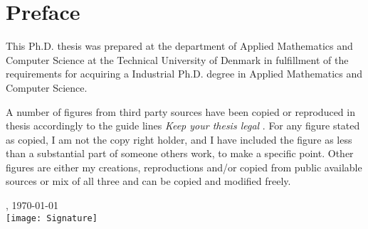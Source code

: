 \chapter{Preface}
This Ph.D. thesis was prepared at the department of Applied Mathematics and Computer Science at the Technical University of Denmark in fulfillment of the requirements for acquiring a Industrial Ph.D. degree in Applied Mathematics and Computer Science.

A number of figures from third party sources have been copied or reproduced in thesis accordingly to the guide lines \textit{Keep your thesis legal} \cite{johnson2015keeping}. For any figure stated as copied, I am not the copy right holder, and I have included the figure as less than a substantial part of someone others work, to make a specific point. Other figures are either my creations, reproductions and/or copied from public available sources or mix of all three and can be copied and modified freely.

\vfill

{
\centering
    \thesislocation{}, \today\\[1cm]
    \hspace{3cm}\texttt{[image: Signature]}\\[1cm]
\begin{flushright}
    \thesisauthor{}
\end{flushright}
}